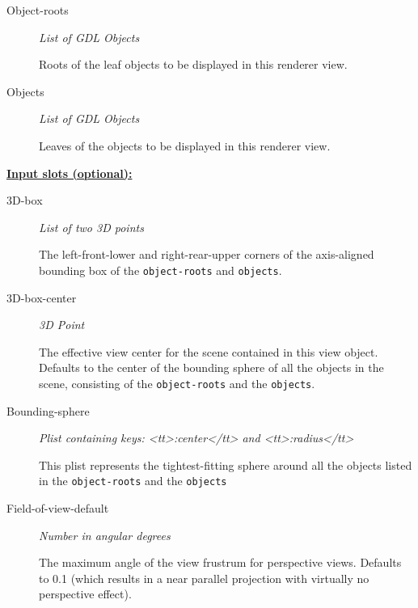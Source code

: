 \documentclass [11pt]{book}
\begin{document}
\begin{itemize}
\begin{description}
\item [Object-roots]
\emph{List of GDL Objects}

 Roots of the leaf objects to be displayed in this renderer view.




\item [Objects]
\emph{List of GDL Objects}

 Leaves of the objects to be displayed in this renderer view.




\end{description}






\textbf{
\underline{Input slots (optional):}}

\begin{description}

\item [3D-box]
\emph{List of two 3D points}

 The left-front-lower and right-rear-upper corners of the axis-aligned bounding
box of the \texttt{object-roots} and \texttt{objects}.




\item [3D-box-center]
\emph{3D Point}

 The effective view center for the scene contained in this view object. Defaults to the center of the bounding sphere of all
the objects in the scene, consisting of the \texttt{object-roots} and the \texttt{objects}.




\item [Bounding-sphere]
\emph{Plist containing keys: <tt>:center</tt> and <tt>:radius</tt>}

 This plist represents the tightest-fitting sphere
around all the objects listed in the \texttt{object-roots} and the \texttt{objects}




\item [Field-of-view-default]
\emph{Number in angular degrees}

 The maximum angle of the view frustrum for perspective views.
Defaults to 0.1 (which results in a near parallel projection with virtually no perspective effect).





\end{description}
\end{itemize}
\end{document}
